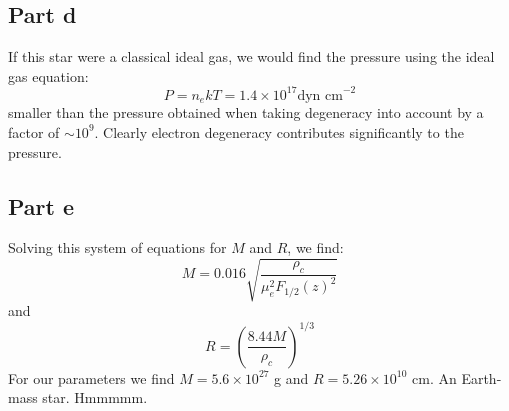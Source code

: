 \documentclass[a4paper, 11pt]{article}
\begin{document}
	\subsection*{Part d}
		If this star were a classical ideal gas, we would find the pressure using the ideal gas equation:
		\begin{equation*}
			P = n_ekT = 1.4\times10^{17} \text{dyn cm}^{-2}
		\end{equation*}
		smaller than the pressure obtained when taking degeneracy into account by a factor 
		of $\sim 10^9$. Clearly electron degeneracy contributes significantly to the pressure. 
	\subsection*{Part e}
		Solving this system of equations for $M$ and $R$, we find:
		\begin{equation*}
			M = 0.016\sqrt{\frac{\rho_c}{\mu_e^2F_{1/2}(z)^2}}
		\end{equation*}
		and 
		\begin{equation*}
			R = \left(\frac{8.44M}{\rho_c}\right)^{1/3}
		\end{equation*}
		For our parameters we find $M=5.6\times10^{27}$ g and $R=5.26\times10^{10}$ cm. An 
		Earth-mass star. Hmmmmm. 
\end{document}
